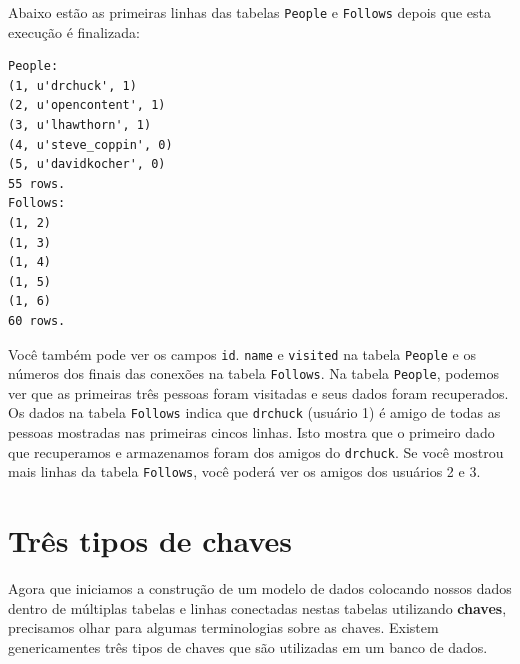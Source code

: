 Abaixo estão as primeiras linhas das tabelas {\tt People} e {\tt Follows}
depois que esta execução é finalizada:

\beforeverb
\begin{verbatim}
People:
(1, u'drchuck', 1)
(2, u'opencontent', 1)
(3, u'lhawthorn', 1)
(4, u'steve_coppin', 0)
(5, u'davidkocher', 0)
55 rows.
Follows:
(1, 2)
(1, 3)
(1, 4)
(1, 5)
(1, 6)
60 rows.
\end{verbatim}
\afterverb
%

%
Você também pode ver os campos {\tt id}. {\tt name} e {\tt visited} na tabela
{\tt People} e os números dos finais das conexões na tabela {\tt Follows}. Na
tabela {\tt People}, podemos ver que as primeiras três pessoas foram visitadas
e seus dados foram recuperados. Os dados na tabela {\tt Follows} indica que
{\tt drchuck} (usuário 1) é amigo de todas as pessoas mostradas nas primeiras
cincos linhas. Isto mostra que o primeiro dado que recuperamos e armazenamos
foram dos amigos do {\tt drchuck}. Se você mostrou mais linhas da tabela
{\tt Follows}, você poderá ver os amigos dos usuários 2 e 3.

\section{Três tipos de chaves}


Agora que iniciamos a construção de um modelo de dados colocando nossos dados
dentro de múltiplas tabelas e linhas conectadas nestas tabelas utilizando
{\bf chaves}, precisamos olhar para algumas terminologias sobre as chaves.
Existem genericamentes três tipos de chaves que são utilizadas em um banco de
dados.

